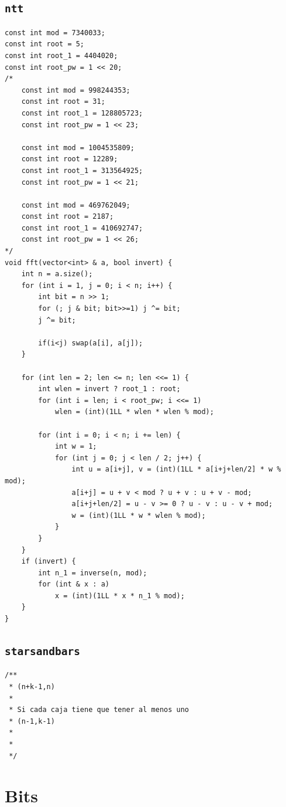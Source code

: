 \subsection{\texttt{ntt}}
\begin{lstlisting}
const int mod = 7340033;
const int root = 5;
const int root_1 = 4404020;
const int root_pw = 1 << 20;
/*
    const int mod = 998244353;
    const int root = 31;
    const int root_1 = 128805723;
    const int root_pw = 1 << 23;

    const int mod = 1004535809;
    const int root = 12289;
    const int root_1 = 313564925;
    const int root_pw = 1 << 21;

    const int mod = 469762049;
    const int root = 2187;
    const int root_1 = 410692747;
    const int root_pw = 1 << 26;
*/
void fft(vector<int> & a, bool invert) {
    int n = a.size();
    for (int i = 1, j = 0; i < n; i++) {
        int bit = n >> 1;
        for (; j & bit; bit>>=1) j ^= bit;
        j ^= bit;

        if(i<j) swap(a[i], a[j]);
    }

    for (int len = 2; len <= n; len <<= 1) {
        int wlen = invert ? root_1 : root;
        for (int i = len; i < root_pw; i <<= 1)
            wlen = (int)(1LL * wlen * wlen % mod);

        for (int i = 0; i < n; i += len) {
            int w = 1;
            for (int j = 0; j < len / 2; j++) {
                int u = a[i+j], v = (int)(1LL * a[i+j+len/2] * w % mod);
                a[i+j] = u + v < mod ? u + v : u + v - mod;
                a[i+j+len/2] = u - v >= 0 ? u - v : u - v + mod;
                w = (int)(1LL * w * wlen % mod);
            }
        }
    }
    if (invert) {
        int n_1 = inverse(n, mod);
        for (int & x : a)
            x = (int)(1LL * x * n_1 % mod);
    }
}\end{lstlisting}

\subsection{\texttt{starsandbars}}
\begin{lstlisting}
/**
 * (n+k-1,n)
 * 
 * Si cada caja tiene que tener al menos uno
 * (n-1,k-1)
 * 
 * 
 */\end{lstlisting}

\section{Bits}

